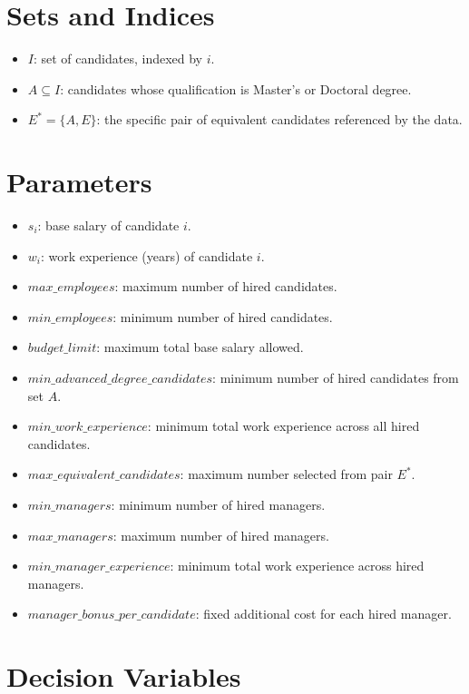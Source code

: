 \section*{Sets and Indices}

\begin{itemize}
    \item $I$: set of candidates, indexed by $i$.
    \item $A \subseteq I$: candidates whose qualification is Master's or Doctoral degree.
    \item $E^\ast = \{A,E\}$: the specific pair of equivalent candidates referenced by the data.
\end{itemize}

\section*{Parameters}

\begin{itemize}
    \item $s_i$: base salary of candidate $i$.
    \item $w_i$: work experience (years) of candidate $i$.
    \item $\textit{max\_employees}$: maximum number of hired candidates.
    \item $\textit{min\_employees}$: minimum number of hired candidates.
    \item $\textit{budget\_limit}$: maximum total base salary allowed.
    \item $\textit{min\_advanced\_degree\_candidates}$: minimum number of hired candidates from set $A$.
    \item $\textit{min\_work\_experience}$: minimum total work experience across all hired candidates.
    \item $\textit{max\_equivalent\_candidates}$: maximum number selected from pair $E^\ast$.
    \item $\textit{min\_managers}$: minimum number of hired managers.
    \item $\textit{max\_managers}$: maximum number of hired managers.
    \item $\textit{min\_manager\_experience}$: minimum total work experience across hired managers.
    \item $\textit{manager\_bonus\_per\_candidate}$: fixed additional cost for each hired manager.
\end{itemize}

\section*{Decision Variables}

